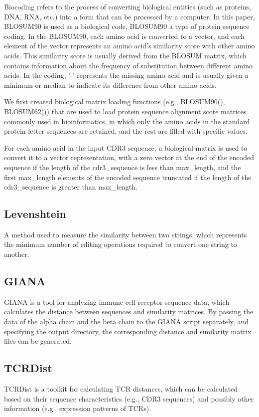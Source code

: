 \documentclass[conference]{IEEEtran}
\begin{document}
	Biocoding refers to the process of converting biological entities (such as proteins, DNA, RNA, etc.) into a form that can be processed by a computer. In this paper, BLOSUM90 is used as a biological code, BLOSUM90 a type of protein sequence coding. In the BLOSUM90, each amino acid is converted to a vector, and each element of the vector represents an amino acid's similarity score with other amino acids. This similarity score is usually derived from the BLOSUM matrix, which contains information about the frequency of substitution between different amino acids. In the coding, '-' represents the missing amino acid and is usually given a minimum or median to indicate its difference from other amino acids.
	
	We first created biological matrix loading functions (e.g., BLOSUM90(), BLOSUM62()) that are used to load protein sequence alignment score matrices commonly used in bioinformatics, in which only the amino acids in the standard protein letter sequences are retained, and the rest are filled with specific values.
	
	For each amino acid in the input CDR3 sequence, a biological matrix is used to convert it to a vector representation, with a zero vector at the end of the encoded sequence if the length of the cdr3\_sequence is less than max\_length, and the first max\_length elements of the encoded sequence truncated if the length of the cdr3\_sequence is greater than max\_length.
	
	\subsection{Levenshtein}\label{AA}
	A method used to measure the similarity between two strings, which represents the minimum number of editing operations required to convert one string to another.
	
	\subsection{GIANA}\label{AA}
	GIANA is a tool for analyzing immune cell receptor sequence data, which calculates the distance between sequences and similarity matrices. By passing the data of the alpha chain and the beta chain to the GIANA script separately, and specifying the output directory, the corresponding distance and similarity matrix files can be generated.
	
	\subsection{TCRDist}\label{AA}
	TCRDist is a toolkit for calculating TCR distances, which can be calculated based on their sequence characteristics (e.g., CDR3 sequences) and possibly other information (e.g., expression patterns of TCRs).
	
\end{document}
